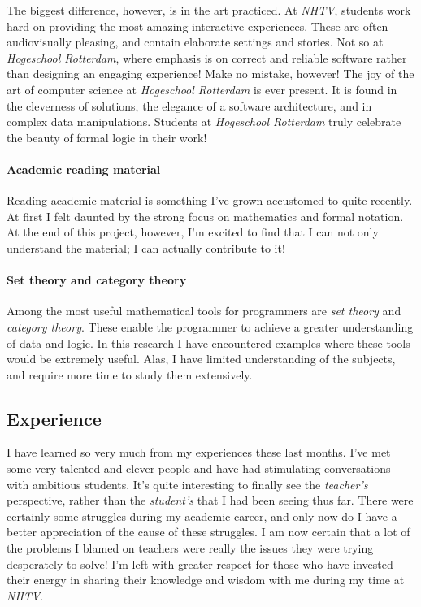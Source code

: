 \documentclass{article}
\begin{document}
The biggest difference, however, is in the art practiced. At {\em NHTV}, students work hard on providing the most amazing
interactive experiences. These are often audiovisually pleasing, and contain elaborate settings and stories. Not so at
{\em Hogeschool Rotterdam}, where emphasis is on correct and reliable software rather than designing an engaging experience!
Make no mistake, however! The joy of the art of computer science at {\em Hogeschool Rotterdam} is ever present. It is found in
the cleverness of solutions, the elegance of a software architecture, and in complex data manipulations. Students at
{\em Hogeschool Rotterdam} truly celebrate the beauty of formal logic in their work!

\paragraph{Academic reading material}
Reading academic material is something I've grown accustomed to quite recently. At first I felt daunted by the strong focus on
mathematics and formal notation. At the end of this project, however, I'm excited to find that I can not only understand the
material; I can actually contribute to it!

\paragraph{Set theory and category theory}
Among the most useful mathematical tools for programmers are {\em set theory} and {\em category theory}. These enable the
programmer to achieve a greater understanding of data and logic. In this research I have encountered examples where these
tools would be extremely useful. Alas, I have limited understanding of the subjects, and require more time to study them
extensively.

\subsection{Experience}
I have learned so very much from my experiences these last months. I've met some very talented and clever people and have had
stimulating conversations with ambitious students. It's quite interesting to finally see the {\em teacher's} perspective, rather
than the {\em student's} that I had been seeing thus far. There were certainly some struggles during my academic career, and
only now do I have a better appreciation of the cause of these struggles. I am now certain that a lot of the problems I blamed
on teachers were really the issues they were trying desperately to solve! I'm left with greater respect for those who have
invested their energy in sharing their knowledge and wisdom with me during my time at {\em NHTV}.
\end{document}
